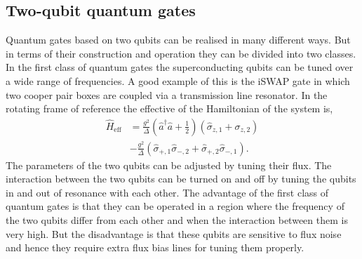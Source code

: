 \documentclass[twocolumn, aps, rmp, amsmath, amssymb, nofootinbib, superscriptaddress, longbibliography, floatfix, table-of-contents, eqsecnum]{revtex4-1}
\begin{document}
\subsection{Two-qubit quantum gates}

Quantum gates based on two qubits can be realised in many different ways. But in terms of their construction and operation they can be divided into two classes. In the first class of quantum gates the superconducting qubits can be tuned over a wide range of frequencies. A good example of this is the iSWAP gate in which two cooper pair boxes are coupled via a transmission line resonator. In the rotating frame of reference the effective of the Hamiltonian of the system is,
\begin{align}
\hat{H}_\mathrm{eff} &= \frac{g^{2}}{\Delta} \left( \hat{a}^{\dag} \hat{a} + \frac{1}{2} \right) (\hat\sigma_{z,1} + \sigma_{z,2}) \nonumber\\
&- \frac{g^{2}}{\Delta} (\hat\sigma_{+,1} \hat\sigma_{-,2} + \hat\sigma_{+,2} \hat\sigma_{-,1}).
\end{align}
The parameters of the two qubits can be adjusted by tuning their flux. The interaction between the two qubits can be turned on and off by tuning the qubits in and out of resonance with each other. The advantage of the first class of quantum gates is that they can be operated in a region where the frequency of the two qubits differ from each other and when the interaction between them is very high. But the disadvantage is that these qubits are sensitive to flux noise and hence they require extra flux bias lines for tuning them properly.
\end{document}
